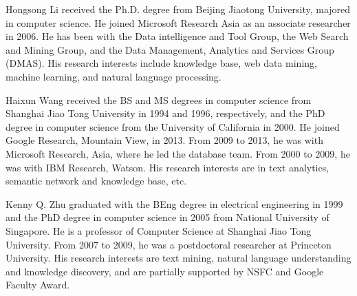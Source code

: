 \documentclass[10pt,journal,cspaper,compsoc]{IEEEtran}
\begin{document}
\begin{minipage}{3.5in}
\begin{IEEEbiography}
\end{IEEEbiography}\vspace{-10mm}
\begin{IEEEbiography}
  {Hongsong Li} received the Ph.D. degree from Beijing Jiaotong University, majored in computer science.
  He joined Microsoft Research Asia as an associate researcher in 2006.
  He has been with the Data intelligence and Tool Group, the Web Search and Mining Group, and the Data Management, Analytics and Services Group (DMAS).
  His research interests include knowledge base, web data mining, machine learning, and natural language processing.
\end{IEEEbiography}\vspace{-10mm}
\begin{IEEEbiography}
  {Haixun Wang} received the BS and MS degrees
in computer science from Shanghai Jiao Tong
University in 1994 and 1996, respectively, and
the PhD degree in computer science from the
University of California in 2000. He joined Google
Research, Mountain View, in 2013. From 2009 to
2013, he was with Microsoft Research, Asia,
where he led the database team. From 2000 to
2009, he was with IBM Research, Watson. His
research interests are in text analytics, semantic
network and knowledge base, etc.
\end{IEEEbiography}\vspace{-10mm}
\begin{IEEEbiography}
  {Kenny Q. Zhu} graduated with the BEng degree
in electrical engineering in 1999 and the PhD
degree in computer science in 2005 from
National University of Singapore. He is a
professor of Computer Science at 
Shanghai Jiao Tong University.
From 2007 to 2009, he was a postdoctoral
researcher at Princeton University. His research
interests are text mining, natural language understanding 
and knowledge discovery, and are partially supported by
NSFC and Google Faculty Award.
\end{IEEEbiography}
\end{minipage}
\end{document}
